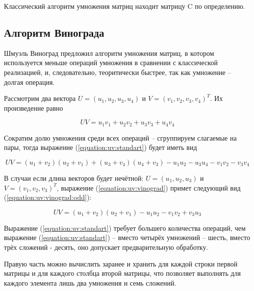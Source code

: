         Классический алгоритм умножения матриц находит матрицу C по определению.

        \subsection{Алгоритм Винограда}
        Шмуэль Виноград предложил алгоритм умножения матриц, в котором используется меньше операций умножения
        в сравнении с классической реализацией, и, следовательно, теоритически быстрее, так как умножение -- долгая операция.

        Рассмотрим два вектора $ U = (u_1, u_2, u_3, u_4) $ и $ V = (v_1, v_2, v_3, v_4)^T $. Их произведение равно 

        \begin{equation}
            UV = u_1v_1 + u_2v_2 + u_3v_3 + u_4v_4
            \label{equation:uv:standart}
        \end{equation}

        Сократим долю умножения среди всех операций -- сгруппируем слагаемые на пары, тогда выражение (\ref{equation:uv:standart}) будет иметь вид

        \begin{equation}
            UV = (u_1 + v_2)(u_2 + v_1) + (u_3 + v_4)(u_4 + v_3) - u_1u_2 - u_3u_4 - v_1v_2 - v_3v_4
            \label{equation:uv:vinograd}
        \end{equation}

        В случаи если длина векторов будет нечётной:
        $ U = (u_1, u_2, u_3) $ и $ V = (v_1, v_2, v_3)^T $,
        выражение (\ref{equation:uv:vinograd}) примет следующий вид (\ref{equation:uv:vinograd:odd}):

        \begin{equation}
            UV = (u_1 + v_2)(u_2 + v_1) - u_1u_2 - v_1v_2 + v_3u_3
            \label{equation:uv:vinograd:odd}
        \end{equation}

        Выражение (\ref{equation:uv:standart}) требует большего количества операций, чем  выражение (\ref{equation:uv:standart}) -- вместо четырёх
        умножений -- шесть, вместо трёх сложений - десять, оно  допускает предварительную обработку.

        Правую часть можно вычислить заранее и хранить для каждой строки первой матрицы 
        и для каждого столбца второй матрицы, что позволяет выполнять для каждого элемента
        лишь два умножения и семь сложений. 
        
